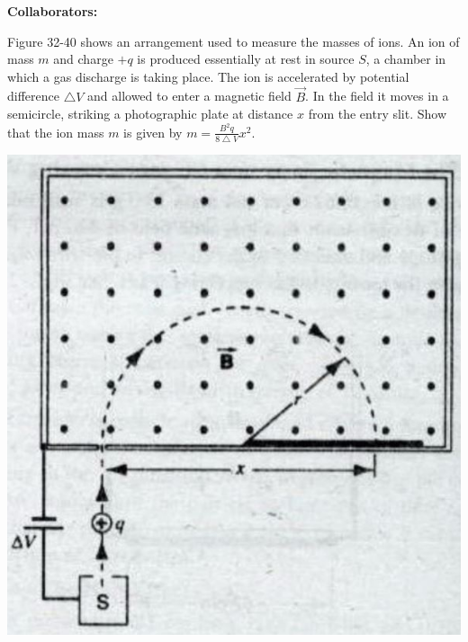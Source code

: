 \documentclass[11pt,letterpaper,boxed]{hmcpset}
\begin{document}
	
	\noindent\textbf{Collaborators:} 
	
	
	\begin{problem} [*HRK P32.6] Figure 32-40 shows an arrangement used to measure the masses of ions. An ion of mass $m$ and charge $+q$ is produced essentially at rest in source $S$, a chamber in which a gas discharge is taking place. The ion is accelerated by potential difference $\bigtriangleup V$ and allowed to enter a magnetic field $\vec{B}$. In the field it moves in a semicircle, striking a photographic plate at distance $x$ from the entry slit. Show that the ion mass $m$ is given by $m = \frac{B^2 q}{8\bigtriangleup V} x^2$.
		\begin{center}
		\includegraphics[scale=.2]{51m8pic.jpg}
		\end{center}
		
	\end{problem}
	
	\begin{solution}
		\vfill
	\end{solution}
	\newpage
\end{document}
